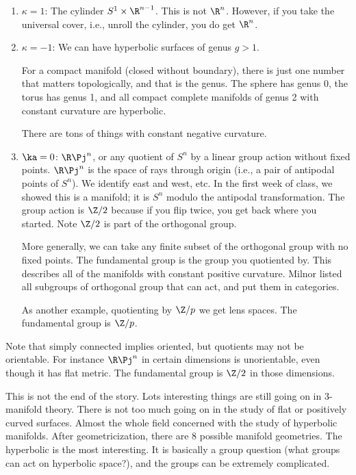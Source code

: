 \begin{enumerate}
\item
$\kappa=1$: The cylinder $S^1\times \R^{n-1}$. This is not $\R^n$. However, if you take the universal cover, i.e., unroll the cylinder, you do get $\R^n$. 
\item 
$\kappa=-1$:
We can have hyperbolic surfaces of genus $g>1$.

For a compact manifold (closed without boundary), there is just one number that matters topologically, and that is the genus. %
The sphere has genus 0, the torus has genus 1, and all compact complete manifolds of genus 2 with constant curvature are hyperbolic.

There are tons of things with constant negative curvature.
\item 
$\ka=0$: 
$\R\Pj^n$, or any quotient of $S^n$ by a linear group action without fixed points. 
$\R\Pj^n$ is the space of rays through origin (i.e., a pair of antipodal points of $S^n$). We identify east and west, etc. In the first week of class, we showed this is a manifold; it is $S^n$ modulo the antipodal transformation. The group action is $\Z/2$ because if you flip twice, you get back where you started. Note $\Z/2$ is part of the orthogonal group. 

More generally, we can take any finite subset of the orthogonal  group with no fixed points. %
The fundamental group is the group you quotiented by. This describes all of the manifolds with constant positive curvature.
Milnor listed all subgroups of orthogonal group that can act, and put them in categories.

As another example, quotienting by $\Z/p$ we  get lens spaces. The fundamental group is $\Z/p$. %
\end{enumerate}
Note that simply connected implies oriented, but quotients may not be orientable. For instance $\R\Pj^n$ in certain dimensions is unorientable, even though it has flat metric. The fundamental group is $\Z/2$ in those dimensions. 

This is not the end of the story. Lots interesting things are still going on in 3-manifold theory. There is not too much going on in the study of flat or positively curved surfaces. Almost the whole field concerned with the study of hyperbolic manifolds. 
After geometricization, there are  8 possible manifold geometries. The hyperbolic is the most interesting. %
It is basically a group question (what groups can act on hyperbolic space?), and the groups can be extremely complicated.

